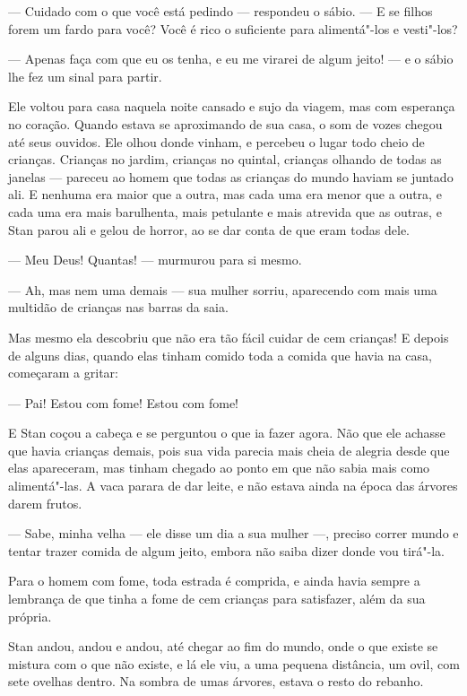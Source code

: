 --- Cuidado com o que você está pedindo --- respondeu o sábio. --- E se
filhos forem um fardo para você? Você é rico o suficiente para
alimentá"-los e vesti"-los? 

--- Apenas faça com que eu os tenha, e eu me virarei de algum jeito! --- e
o sábio lhe fez um sinal para partir.

Ele voltou para casa naquela noite cansado e sujo da viagem, mas com
esperança no coração. Quando estava se aproximando de sua casa, o som
de vozes chegou até seus ouvidos. Ele olhou donde vinham, e percebeu
o lugar todo cheio de crianças. Crianças no jardim, crianças no
quintal, crianças olhando de todas as janelas --- pareceu ao homem que
todas as crianças do mundo haviam se juntado ali. E nenhuma era maior
que a outra, mas cada uma era menor que a outra, e cada uma era mais
barulhenta, mais petulante e mais atrevida que as outras, e Stan
parou ali e gelou de horror, ao se dar conta de que eram todas dele.

--- Meu Deus! Quantas! --- murmurou para si mesmo.

--- Ah, mas nem uma demais --- sua mulher sorriu, aparecendo com mais uma
multidão de crianças nas barras da saia.

Mas mesmo ela descobriu que não era tão fácil cuidar de cem crianças!
E depois de alguns dias, quando elas tinham comido toda a comida que
havia na casa, começaram a gritar:

--- Pai! Estou com fome! Estou com fome! 

E Stan coçou a cabeça e se perguntou o que ia fazer agora. Não que ele
achasse que havia crianças demais, pois sua vida parecia mais cheia
de alegria desde que elas apareceram, mas tinham chegado ao ponto em
que não sabia mais como alimentá"-las. A vaca parara de dar leite, e
não estava ainda na época das árvores darem frutos.

--- Sabe, minha velha --- ele disse um dia a sua mulher ---, preciso correr
mundo e tentar trazer comida de algum jeito, embora não saiba dizer
donde vou tirá"-la.

Para o homem com fome, toda estrada é comprida, e ainda havia sempre a
lembrança de que tinha a fome de cem crianças para satisfazer, além
da sua própria.

Stan andou, andou e andou, até chegar ao fim do mundo, onde o que
existe se mistura com o que não existe, e lá ele viu, a uma pequena
distância, um ovil, com sete ovelhas dentro. Na sombra de umas
árvores, estava o resto do rebanho.

